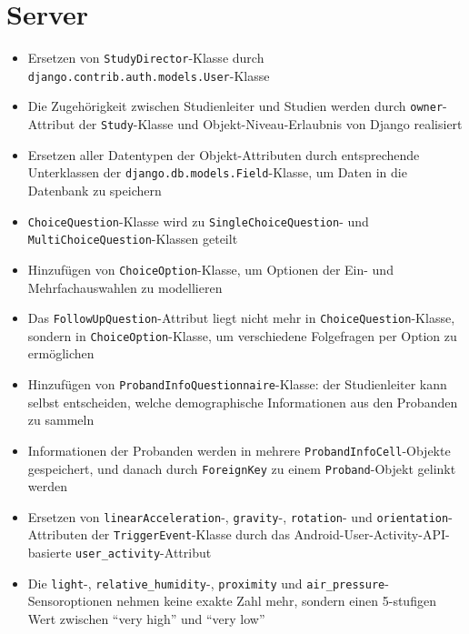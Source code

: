 \documentclass[a4paper]{scrreprt}
\begin{document}
        \section{Server}
            \begin{itemize}
                \item Ersetzen von \texttt{StudyDirector}-Klasse durch \texttt{django.contrib.auth.models.User}-Klasse

                \item Die Zugehörigkeit zwischen Studienleiter und Studien werden durch \texttt{owner}-Attribut der \texttt{Study}-Klasse und Objekt-Niveau-Erlaubnis von Django realisiert

                \item Ersetzen aller Datentypen der Objekt-Attributen durch entsprechende Unterklassen der \texttt{django.db.models.Field}-Klasse, um Daten in die Datenbank zu speichern

                \item \texttt{ChoiceQuestion}-Klasse wird zu \texttt{SingleChoiceQuestion}- und \texttt{MultiChoiceQuestion}-Klassen geteilt

                \item Hinzufügen von \texttt{ChoiceOption}-Klasse, um Optionen der Ein- und Mehrfachauswahlen zu modellieren

                \item Das \texttt{FollowUpQuestion}-Attribut liegt nicht mehr in \texttt{ChoiceQuestion}-Klasse, sondern in \texttt{ChoiceOption}-Klasse, um verschiedene Folgefragen per Option zu ermöglichen

                \item Hinzufügen von \texttt{ProbandInfoQuestionnaire}-Klasse: der Studienleiter kann selbst entscheiden, welche demographische Informationen aus den Probanden zu sammeln

                \item Informationen der Probanden werden in mehrere \texttt{ProbandInfoCell}-Objekte gespeichert, und danach durch \texttt{ForeignKey} zu einem \texttt{Proband}-Objekt gelinkt werden

                \item Ersetzen von \texttt{linearAcceleration}-, \texttt{gravity}-, \texttt{rotation}- und \texttt{orientation}-Attributen der \texttt{TriggerEvent}-Klasse durch das Android-User-Activity-API-basierte \texttt{user\_activity}-Attribut

                \item Die \texttt{light}-, \texttt{relative\_humidity}-, \texttt{proximity} und \texttt{air\_pressure}-Sensoroptionen nehmen keine exakte Zahl mehr, sondern einen 5-stufigen Wert zwischen “very high” und “very low”


            \end{itemize}
\end{document}
